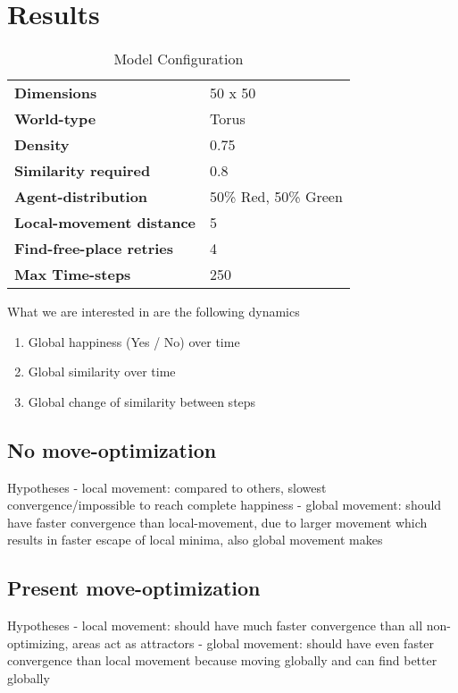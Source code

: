 \section{Results}

\begin{table*}[t]
	\centering
	\caption{Model Configuration}
	\label{tab:model_configuration}
		\begin{tabular}{ l | l }
			\hline \hline
			\textbf{Dimensions}					& 50 x 50 \\  
			\textbf{World-type}					& Torus	\\ 
			\textbf{Density}					& 0.75	\\ 
			\textbf{Similarity required}		& 0.8	\\ 
			\textbf{Agent-distribution}			& 50\% Red, 50\% Green	\\ 
			\textbf{Local-movement distance}	& 5	\\ 
			\textbf{Find-free-place retries}	& 4	\\ 
			\textbf{Max Time-steps}				& 250 \\ 
			\hline \hline
		\end{tabular}
\end{table*}


What we are interested in are the following dynamics
\begin{enumerate}
	\item Global happiness (Yes / No) over time
	\item Global similarity over time
	\item Global change of similarity between steps
\end{enumerate}

\subsection{No move-optimization}
Hypotheses
	- local movement: compared to others, slowest convergence/impossible to reach complete happiness
	- global movement: should have faster convergence than local-movement, due to larger movement which results in faster escape of local minima, also global movement makes 
	
\subsection{Present move-optimization}
Hypotheses
	- local movement: should have much faster convergence than all non-optimizing, areas act as attractors
	- global movement: should have even faster convergence than local movement because moving globally and can find better globally 
	
